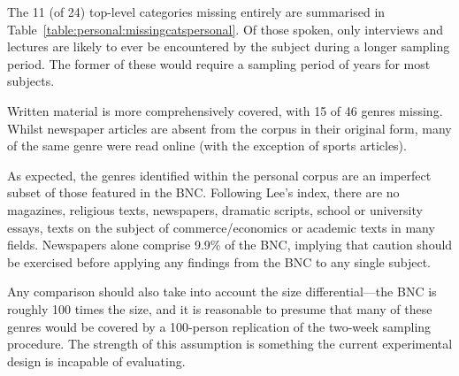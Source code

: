 The 11 (of 24) top-level categories missing entirely are summarised in Table~\ref{table:personal:missingcatspersonal}.  Of those spoken, only interviews and lectures are likely to ever be encountered by the subject during a longer sampling period.  The former of these would require a sampling period of years for most subjects.

Written material is more comprehensively covered, with 15 of 46 genres missing.  Whilst newspaper articles are absent from the corpus in their original form, many of the same genre were read online (with the exception of sports articles).  

As expected, the genres identified within the personal corpus are an imperfect subset of those featured in the BNC.  Following Lee's index, there are no magazines, religious texts, newspapers, dramatic scripts, school or university essays, texts on the subject of commerce/economics or academic texts in many fields.  Newspapers alone comprise 9.9\% of the BNC, implying that caution should be exercised before applying any findings from the BNC to any single subject. %

Any comparison should also take into account the size differential---the BNC is roughly 100 times the size, and it is reasonable to presume that many of these genres would be covered by a 100-person replication of the two-week sampling procedure.  The strength of this assumption is something the current experimental design is incapable of evaluating.













